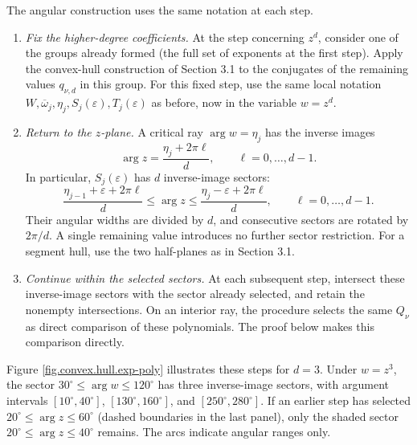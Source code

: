 \documentclass[a4paper,12pt]{article}
\numberwithin{equation}{section}
\begin{document}
The angular construction uses the same notation at each step.
\begin{enumerate}
\item \textit{Fix the higher-degree coefficients.}
At the step concerning $z^d$, consider one of the groups already formed
(the full set of exponents at the first step).
Apply the convex-hull construction of Section 3.1 to the conjugates
of the remaining values $q_{\nu,d}$ in this group.
For this fixed step, use the same local notation
$W,\overline\omega_j,\eta_j,S_j(\varepsilon),T_j(\varepsilon)$ as before,
now in the variable $w=z^d$.

\item \textit{Return to the $z$-plane.}
A critical ray $\arg w=\eta_j$ has the inverse images
\[
 \arg z=\frac{\eta_j+2\pi\ell}{d},\qquad \ell=0,\ldots,d-1.
\]
In particular, $S_j(\varepsilon)$ has $d$ inverse-image sectors:
\[
 \frac{\eta_{j-1}+\varepsilon+2\pi\ell}{d}
 \le\arg z\le
 \frac{\eta_j-\varepsilon+2\pi\ell}{d},
 \qquad \ell=0,\ldots,d-1.
\]
Their angular widths are divided by $d$, and consecutive sectors are
rotated by $2\pi/d$.
A single remaining value introduces no further sector restriction.
For a segment hull, use the two half-planes as in Section 3.1.

\item \textit{Continue within the selected sectors.}
At each subsequent step, intersect these inverse-image sectors with
the sector already selected, and retain the nonempty intersections.
On an interior ray, the procedure selects
the same $Q_\nu$ as direct comparison of these polynomials.
The proof below makes this comparison directly.
\end{enumerate}

Figure \ref{fig.convex.hull.exp-poly} illustrates these steps for $d=3$.
Under $w=z^3$, the sector $30^\circ\le\arg w\le120^\circ$ has three
inverse-image sectors, with argument intervals
$[10^\circ,40^\circ]$, $[130^\circ,160^\circ]$, and $[250^\circ,280^\circ]$.
If an earlier step has selected $20^\circ\le\arg z\le60^\circ$
(dashed boundaries in the last panel), only the shaded sector
$20^\circ\le\arg z\le40^\circ$ remains. The arcs indicate angular ranges only.
\end{document}
